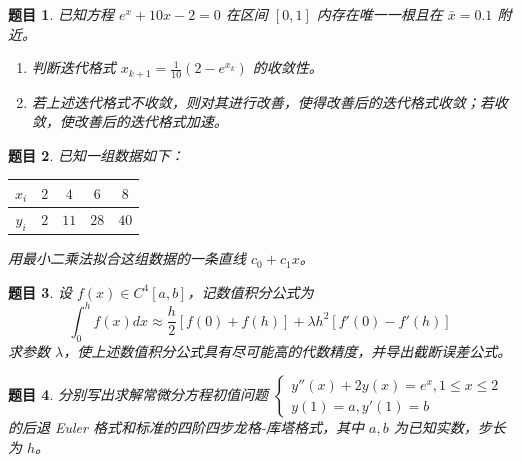 \documentclass[12pt,a4paper]{article}
\newtheorem{problem}{题目}
\newcommand{\largeanswer}{\newpage\vspace*{0.5cm}\vspace{0.5cm}}
\begin{document}
    \largeanswer
    
    \begin{problem}
        已知方程 $e^x + 10x - 2 = 0$ 在区间 $[0,1]$ 内存在唯一一根且在 $\bar{x} = 0.1$ 附近。
        \begin{enumerate}
            \item 判断迭代格式 $x_{k+1} = \frac{1}{10}(2 - e^{x_k})$ 的收敛性。
            \item 若上述迭代格式不收敛，则对其进行改善，使得改善后的迭代格式收敛；若收敛，使改善后的迭代格式加速。
        \end{enumerate}
    \end{problem}
    
    \largeanswer
    
    \begin{problem}
        已知一组数据如下：
        
        \begin{center}
            \begin{tabular}{|c|c|c|c|c|}
                \hline
                $x_i$ & $2$ & $4$ & $6$ & $8$ \\
                \hline
                $y_i$ & $2$ & $11$ & $28$ & $40$ \\
                \hline
            \end{tabular}
        \end{center}
        
        用最小二乘法拟合这组数据的一条直线 $c_0 + c_1 x$。
    \end{problem}
    
    \largeanswer
    
    \begin{problem}
        设 $f(x) \in C^4[a,b]$，记数值积分公式为 $$\int_0^h f(x) dx \approx \frac{h}{2}[f(0) + f(h)] + \lambda h^2[f'(0) - f'(h)]$$
        求参数 $\lambda$，使上述数值积分公式具有尽可能高的代数精度，并导出截断误差公式。
    \end{problem}
    
    \largeanswer
    
    \begin{problem}
        分别写出求解常微分方程初值问题 
        $\begin{cases}
            y''(x) + 2y(x) = e^x, 1 \leq x \leq 2 \\
            y(1) = a, y'(1) = b
        \end{cases}$
        的后退 Euler 格式和标准的四阶四步龙格-库塔格式，其中 $a,b$ 为已知实数，步长为 $h$。
    \end{problem}
    
\end{document}
